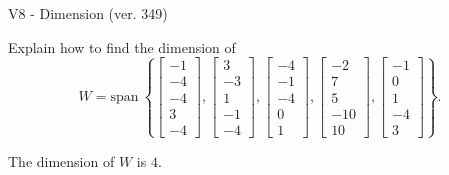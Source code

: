 \begin{exercise}
  \begin{exerciseTitle}V8 - Dimension (ver. 349)\end{exerciseTitle}
  \begin{exerciseStatement}
    Explain how to find the dimension of 
\[W=\mathrm{span}\ \left\{\left[\begin{array}{r}
-1 \\
-4 \\
-4 \\
3 \\
-4
\end{array}\right] , \left[\begin{array}{r}
3 \\
-3 \\
1 \\
-1 \\
-4
\end{array}\right] , \left[\begin{array}{r}
-4 \\
-1 \\
-4 \\
0 \\
1
\end{array}\right] , \left[\begin{array}{r}
-2 \\
7 \\
5 \\
-10 \\
10
\end{array}\right] , \left[\begin{array}{r}
-1 \\
0 \\
1 \\
-4 \\
3
\end{array}\right]\right\}.\]



  \end{exerciseStatement}
  \begin{exerciseAnswer}
   The dimension of \(W\) is  \(4\).
  


  \end{exerciseAnswer}
\end{exercise}